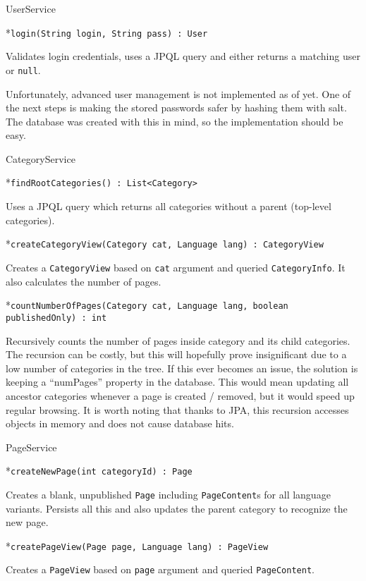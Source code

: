 \vfil \break

\secc UserService

\begitems

*{\tt login(String login, String pass) : User}

Validates login credentials, uses a JPQL query and either returns a matching user or {\tt null}.

\enditems

Unfortunately, advanced user management is not implemented as of yet. One of the next steps is making the stored passwords safer by hashing them with salt. The database was created with this in mind, so the implementation should be easy.

\secc CategoryService

\begitems

*{\tt findRootCategories() : List<Category>}

Uses a JPQL query which returns all categories without a parent (top-level categories).

*{\tt createCategoryView(Category cat, Language lang) : CategoryView}

Creates a {\tt CategoryView} based on {\tt cat} argument and queried {\tt CategoryInfo}. It also calculates the number of pages.

*{\tt countNumberOfPages(Category cat, Language lang, boolean publishedOnly) : int}

Recursively counts the number of pages inside category and its child categories. The recursion can be costly, but this will hopefully prove insignificant due to a low number of categories in the tree. If this ever becomes an issue, the solution is keeping a “numPages” property in the database. This would mean updating all ancestor categories whenever a page is created / removed, but it would speed up regular browsing. It is worth noting that thanks to JPA, this recursion accesses objects in memory and does not cause database hits.

\enditems

\secc PageService

\begitems

*{\tt createNewPage(int categoryId) : Page}

Creates a blank, unpublished {\tt Page} including {\tt PageContent}s for all language variants. Persists all this and also updates the parent category to recognize the new page.

*{\tt createPageView(Page page, Language lang) : PageView}

Creates a {\tt PageView} based on {\tt page} argument and queried {\tt PageContent}.

